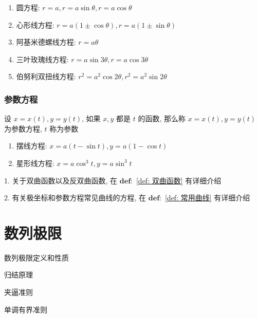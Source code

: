 \begin{definition}[重要极坐标方程]
	\begin{enumerate}
		\item 圆方程: $r = a, r = a\sin\theta, r = a\cos\theta$
		\item 心形线方程: $r = a(1\pm \cos\theta), r = a(1\pm \sin\theta)$
		\item 阿基米德螺线方程: $r = a\theta$
		\item 三叶玫瑰线方程: $r = a\sin 3\theta, r = a\cos 3\theta$
		\item 伯努利双扭线方程: $r^{2} = a^{2}\cos 2\theta, r^{2} = a^{2}\sin 2\theta$
	\end{enumerate}
\end{definition}
\subsection{参数方程}
\begin{definition}[参数方程]
	设 $x=x(t),y=y(t)$, 如果 $x,y$ 都是 $t$ 的函数, 那么称 $x=x(t),y=y(t)$ 为参数方程, $t$ 称为参数
\end{definition}
\begin{definition}[重要参数方程]
	\begin{enumerate}
		\item 摆线方程: $x = a(t-\sin t), y = a(1-\cos t)$
		\item 星形线方程: $x = a\cos^{3} t, y = a\sin^{3} t$
	\end{enumerate}
\end{definition}
\begin{anymark}[注]
	1. 关于双曲函数以及反双曲函数, 在 $\mathbf{def:}$ \ref{def: 双曲函数} 有详细介绍
	
	2. 有关极坐标和参数方程常见曲线的方程, 在 $\mathbf{def:}$ \ref{def: 常用曲线} 有详细介绍 
\end{anymark}





\chapter{数列极限}
\begin{introduction}
	\item 数列极限定义和性质
	\item 归结原理
	\item 夹逼准则
	\item 单调有界准则
\end{introduction}
